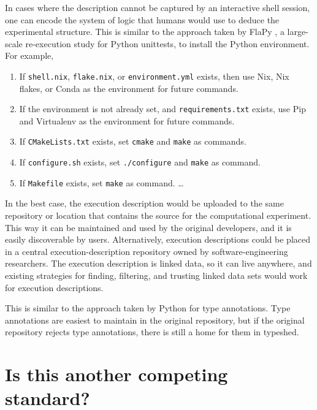 \documentclass[manuscript,authordraft]{acmart}
\providecommand{\tightlist}{\setlength{\itemsep}{0pt}\setlength{\parskip}{0pt}}
\begin{document}
In cases where the description cannot be captured by an interactive
shell session, one can encode the system of logic that humans would use
to deduce the experimental structure. This is similar to the approach
taken by FlaPy \cite{gruber_empirical_2021}, a large-scale re-execution
study for Python unittests, to install the Python environment. For
example,

\begin{enumerate}
\def\labelenumi{\arabic{enumi}.}
\tightlist
\item
  If \texttt{shell.nix}, \texttt{flake.nix}, or \texttt{environment.yml}
  exists, then use Nix, Nix flakes, or Conda as the environment for
  future commands.
\item
  If the environment is not already set, and \texttt{requirements.txt}
  exists, use Pip and Virtualenv as the environment for future commands.
\item
  If \texttt{CMakeLists.txt} exists, set \texttt{cmake} and
  \texttt{make} as commands.
\item
  If \texttt{configure.sh} exists, set \texttt{./configure} and
  \texttt{make} as command.
\item
  If \texttt{Makefile} exists, set \texttt{make} as command. \ldots{}
\end{enumerate}

In the best case, the execution description would be uploaded to the
same repository or location that contains the source for the
computational experiment. This way it can be maintained and used by the
original developers, and it is easily discoverable by users.
Alternatively, execution descriptions could be placed in a central
execution-description repository owned by software-engineering
researchers. The execution description is linked data, so it can live
anywhere, and existing strategies for finding, filtering, and trusting
linked data sets would work for execution descriptions.

This is similar to the approach taken by Python for type annotations.
Type annotations are easiest to maintain in the original repository, but
if the original repository rejects type annotations, there is still a
home for them in typeshed.

\hypertarget{is-this-another-competing-standard}{%
\section{Is this another competing
standard?}\label{is-this-another-competing-standard}}
\end{document}
